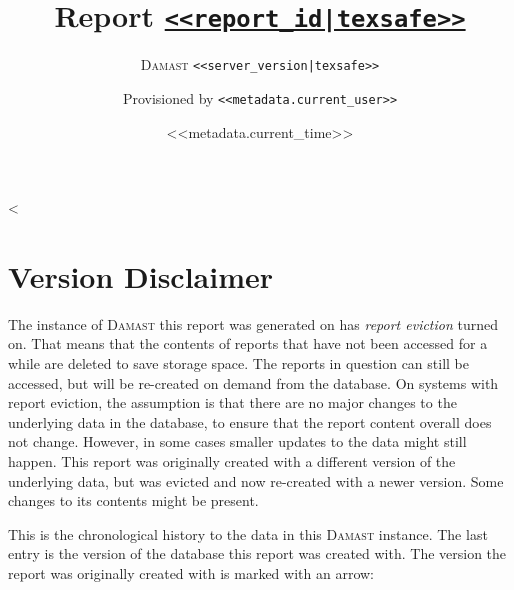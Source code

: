 \documentclass[fontsize=10pt,toc=chapterentrywithdots]{scrreprt}
\begin{document}
\title{Report \texttt{\href{<<report_url|texsafe>>}{<<report_id|texsafe>>}}}
\subtitle{\textsc{Damast} \texttt{<<server_version|texsafe>>}}
\date{<<metadata.current_time>>}
\author{Provisioned by \texttt{<<metadata.current_user>>}}
\publishers{Generated with \textsc{Damast} \\ \small{\url{https://github.com/UniStuttgart-VISUS/damast}}}

\maketitle

\pagestyle{scrheadings}
\cfoot*{}
\chead*{}
\ihead*{\textsc{\rightmark}}

\tableofcontents

<%
\clearpage
\chapter*{Version Disclaimer}
\label{chapter:version-disclaimer}

The instance of \textsc{Damast} this report was generated on has \emph{report eviction} turned on.
That means that the contents of reports that have not been accessed for a while are deleted to save storage space.
The reports in question can still be accessed, but will be re-created on demand from the database.
On systems with report eviction, the assumption is that there are no major changes to the underlying data in the database, to ensure that the report content overall does not change.
However, in some cases smaller updates to the data might still happen.
This report was originally created with a different version of the underlying data, but was evicted and now re-created with a newer version.
Some changes to its contents might be present.

This is the chronological history to the data in this \textsc{Damast} instance.
The last entry is the version of the database this report was created with.
The version the report was originally created with is marked with an arrow:
\end{document}
